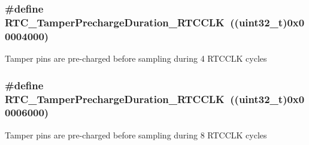 \subsubsection[{R\+T\+C\+\_\+\+Tamper\+Precharge\+Duration\+\_\+4\+R\+T\+C\+C\+L\+K}]{\setlength{\rightskip}{0pt plus 5cm}\#define R\+T\+C\+\_\+\+Tamper\+Precharge\+Duration\+\_\+R\+T\+C\+C\+L\+K~((uint32\+\_\+t)0x00004000)}\label{group___r_t_c___tamper___pin___precharge___duration___definitions_gaaad3b9cb77e5218cc271e68b2f5e6b44}
Tamper pins are pre-\/charged before sampling during 4 R\+T\+C\+C\+L\+K cycles \hypertarget{group___r_t_c___tamper___pin___precharge___duration___definitions_ga5b5b8e47db4271d3ab7e8ca16dbb645c}{}
\subsubsection[{R\+T\+C\+\_\+\+Tamper\+Precharge\+Duration\+\_\+8\+R\+T\+C\+C\+L\+K}]{\setlength{\rightskip}{0pt plus 5cm}\#define R\+T\+C\+\_\+\+Tamper\+Precharge\+Duration\+\_\+R\+T\+C\+C\+L\+K~((uint32\+\_\+t)0x00006000)}\label{group___r_t_c___tamper___pin___precharge___duration___definitions_ga5b5b8e47db4271d3ab7e8ca16dbb645c}
Tamper pins are pre-\/charged before sampling during 8 R\+T\+C\+C\+L\+K cycles 